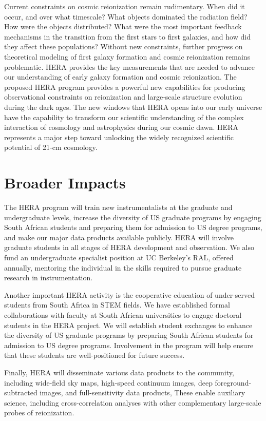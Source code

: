\documentclass[preprint]{aastex}
\begin{document}
Current constraints on cosmic reionization remain rudimentary. When did it
occur, and over what timescale?  What objects dominated the radiation field?
How were the objects distributed? 
What were the most important feedback mechanisms in the transition
from the first stars to first galaxies, and how did they affect these populations?
Without new constraints, further
progress on theoretical modeling of first galaxy formation and cosmic
reionization remains problematic.  
HERA provides the key measurements
that are needed to
advance our understanding of early galaxy formation and
cosmic reionization.
The proposed HERA program provides a
powerful new capabilities for producing observational constraints on reionization and
large-scale structure evolution during the dark ages.  The new
windows that HERA opens into our early universe have the capability to
transform our scientific understanding of the complex interaction of cosmology
and astrophysics during our cosmic dawn.  HERA represents a major step toward unlocking the widely recognized scientific potential of
21-cm cosmology.

\section*{Broader Impacts}

The HERA program will train new
instrumentalists at the graduate and undergraduate levels, increase the
diversity of US graduate programs by engaging South African students and
preparing them for admission to US degree programs, and make our major data
products available publicly.
HERA will involve graduate students in all
stages of HERA development and observation. We also fund an
undergraduate specialist position
at UC Berkeley's RAL, offered annually,
mentoring the individual in the skills required to pursue graduate
research in instrumentation.

Another important HERA activity is the cooperative education of
under-served students from South Africa in STEM fields.
We have established formal collaborations
with faculty at South African universities to engage doctoral students in the HERA project.
We will establish
student exchanges to enhance
the diversity of US graduate programs by preparing South African students for
admission to US degree programs.
Involvement in the
program will help ensure that these students are well-positioned for
future success.

Finally, HERA will disseminate various data products to the community,
including wide-field sky maps, high-speed continuum images, deep
foreground-subtracted images, and full-sensitivity data products,  These enable
auxiliary science, including cross-correlation analyses with other 
complementary large-scale
probes of reionization.
\end{document}
